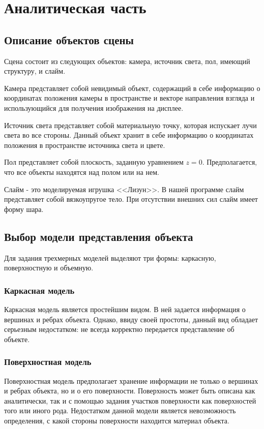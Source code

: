 \chapter{Аналитическая часть}

\section{Описание объектов сцены}

Сцена состоит из следующих объектов: камера, источник света, пол, имеющий структуру, и слайм.

Камера представляет собой невидимый объект, содержащий в себе информацию о координатах положения камеры в пространстве и векторе направления взгляда и использующийся для получения изображения на дисплее.

Источник света представляет собой материальную точку, которая испускает лучи света во все стороны. Данный объект хранит в себе информацию о координатах положения в пространстве источника света и цвете.

Пол представляет собой плоскость, заданную уравнением $z = 0$. Предполагается, что все объекты находятся над полом или на нем.

Слайм - это моделируемая игрушка <<Лизун>>. В нашей программе слайм представляет собой вязкоупругое тело. При отсутствии внешних сил слайм имеет форму шара.

\section{Выбор модели представления объекта}

Для задания трехмерных моделей выделяют три формы: каркасную, поверхностную и объемную.

\subsection{Каркасная модель}
Каркасная модель является простейшим видом. В ней задается информация о вершинах и ребрах объекта. Однако, ввиду своей простоты, данный вид обладает серьезным недостатком: не всегда корректно передается представление об объекте.

\subsection{Поверхностная модель}
Поверхностная модель предполагает хранение информации не только о вершинах и ребрах объекта, но и о его поверхности. Поверхность может быть описана как аналитически, так и с помощью задания участков поверхности как поверхностей того или иного рода. Недостатком данной модели является невозможность определения, с какой стороны поверхности находится материал объекта.

